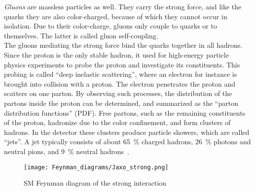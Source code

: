 \begin{minipage}{0.55\textwidth}
\textit{Gluons} are massless particles as well.
They carry the strong force, and like the quarks they are also color-charged, because of which they cannot occur in isolation.
Due to their color-charge, gluons only couple to quarks or to themselves.
The latter is called gluon self-coupling.\\
The gluons mediating the strong force bind the quarks together in all hadrons.
Since the proton is the only stable hadron, it used for high-energy particle physics experiments to probe the proton and investigate its constituents.
This probing is called ``deep inelastic scattering'', where an electron for instance is brought into collision with a proton.
The electron penetrates the proton and scatters on one parton.
By observing such processes, the distribution of the partons inside the proton can be determined, and summarized as the ``parton distribution functions'' (PDF).
Free partons, such as the remaining constituents of the proton, hadronize due to the color confinement, and form clusters of hadrons.
In the detector these clusters produce particle showers, which are called ``jets''.
A jet typically consists of about \SI{65}{\percent} charged hadrons, \SI{26}{\percent} photons and neutral pions, and \SI{9}{\percent} neutral hadrons~\cite[p. 2]{PFA}.
\end{minipage} \hfill
\begin{minipage}{0.4\textwidth}
\centering
\begin{figure}[H]\centering
\texttt{[image: Feynman\_diagrams/Jaxo\_strong.png]}
\caption{SM Feynman diagram of the strong interaction}
\label{fig:Feynman:strong} 
\end{figure}
\end{minipage}

